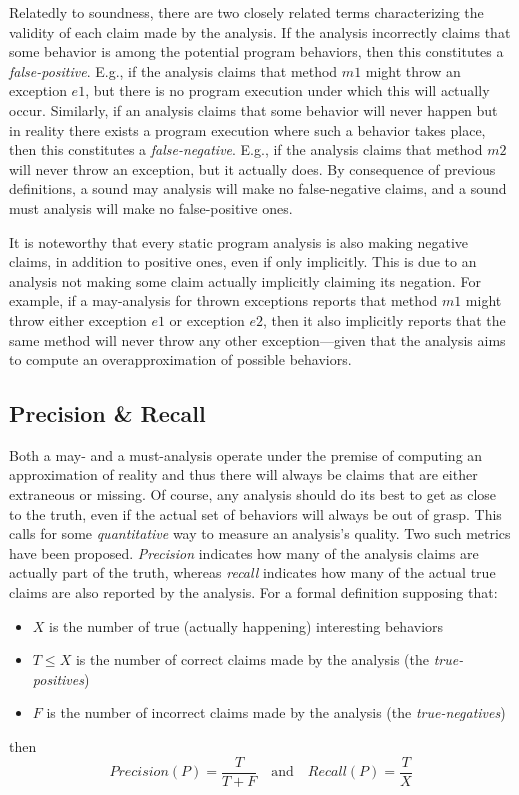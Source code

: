 Relatedly to soundness, there are two closely related terms characterizing the
validity of each claim made by the analysis. If the analysis incorrectly claims
that some behavior is among the potential program behaviors, then this
constitutes a \emph{false-positive}. E.g., if the analysis claims that method
$m1$ might throw an exception $e1$, but there is no program execution under
which this will actually occur. Similarly, if an analysis claims that some
behavior will never happen but in reality there exists a program execution
where such a behavior takes place, then this constitutes a
\emph{false-negative}. E.g., if the analysis claims that method $m2$ will never
throw an exception, but it actually does. By consequence of previous
definitions, a sound may analysis will make no false-negative claims, and a
sound must analysis will make no false-positive ones.

It is noteworthy that every static program analysis is also making negative
claims, in addition to positive ones, even if only implicitly. This is due to
an analysis not making some claim actually implicitly claiming its negation.
For example, if a may-analysis for thrown exceptions reports that method $m1$
might throw either exception $e1$ or exception $e2$, then it also implicitly
reports that the same method will never throw any other exception---given that
the analysis aims to compute an overapproximation of possible behaviors.


\subsection{Precision \& Recall}

Both a may- and a must-analysis operate under the premise of computing an
approximation of reality and thus there will always be claims that are either
extraneous or missing. Of course, any analysis should do its best to get as
close to the truth, even if the actual set of behaviors will always be out of
grasp. This calls for some \emph{quantitative} way to measure an analysis's
quality. Two such metrics have been proposed. \emph{Precision} indicates how
many of the analysis claims are actually part of the truth, whereas
\emph{recall} indicates how many of the actual true claims are also reported by
the analysis. For a formal definition supposing that:
\begin{itemize}
    \item $X$ is the number of true (actually happening) interesting behaviors
    \item $T \leq X$ is the number of correct claims made by the analysis (the \emph{true-positives})
    \item $F$ is the number of incorrect claims made by the analysis (the \emph{true-negatives})
\end{itemize}
then
\[
Precision(P) = \frac{T}{T + F}
\quad \textrm{and} \quad
Recall(P) = \frac{T}{X}
\]

